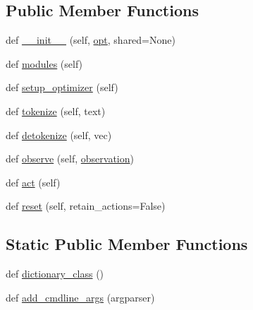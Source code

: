 \subsection*{Public Member Functions}
\begin{DoxyCompactItemize}
\item 
def \hyperlink{classprojects_1_1taskntalk_1_1coopgame__agent_1_1CooperativeGameAgent_aee05007c3aa3127ebc9c6deff777c884}{\+\_\+\+\_\+init\+\_\+\+\_\+} (self, \hyperlink{classparlai_1_1core_1_1agents_1_1Agent_ab3b45d2754244608c75d4068b90cd051}{opt}, shared=None)
\item 
def \hyperlink{classprojects_1_1taskntalk_1_1coopgame__agent_1_1CooperativeGameAgent_afe7b621baea1c0bbc86fb5c815428c63}{modules} (self)
\item 
def \hyperlink{classprojects_1_1taskntalk_1_1coopgame__agent_1_1CooperativeGameAgent_adbd6d539317548bc9fe5e4ceccbe89e0}{setup\+\_\+optimizer} (self)
\item 
def \hyperlink{classprojects_1_1taskntalk_1_1coopgame__agent_1_1CooperativeGameAgent_ad61f88467c3cef93c85292b733a5ec91}{tokenize} (self, text)
\item 
def \hyperlink{classprojects_1_1taskntalk_1_1coopgame__agent_1_1CooperativeGameAgent_afa4b457e8d225f99cc97d30753dd1ff0}{detokenize} (self, vec)
\item 
def \hyperlink{classprojects_1_1taskntalk_1_1coopgame__agent_1_1CooperativeGameAgent_a6c3dbce5e745edf451daff9474b6a52f}{observe} (self, \hyperlink{classprojects_1_1taskntalk_1_1coopgame__agent_1_1CooperativeGameAgent_a935d5ccb012f0acfccddc34ba1c414ad}{observation})
\item 
def \hyperlink{classprojects_1_1taskntalk_1_1coopgame__agent_1_1CooperativeGameAgent_a6c41bb531d4581a70347b311922ab885}{act} (self)
\item 
def \hyperlink{classprojects_1_1taskntalk_1_1coopgame__agent_1_1CooperativeGameAgent_aa5fe586f3c20c7db8eea6ffae87b0a34}{reset} (self, retain\+\_\+actions=False)
\end{DoxyCompactItemize}
\subsection*{Static Public Member Functions}
\begin{DoxyCompactItemize}
\item 
def \hyperlink{classprojects_1_1taskntalk_1_1coopgame__agent_1_1CooperativeGameAgent_aa7758c445e0e2213116e667184a6b31b}{dictionary\+\_\+class} ()
\item 
def \hyperlink{classprojects_1_1taskntalk_1_1coopgame__agent_1_1CooperativeGameAgent_af06b68508ab556b36c19c9378ce1f63e}{add\+\_\+cmdline\+\_\+args} (argparser)
\end{DoxyCompactItemize}

